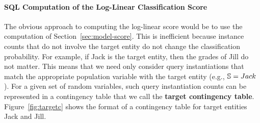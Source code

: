\documentclass{acm_proc_article-sp}
\begin{document}

\paragraph{SQL Computation of the Log-Linear Classification Score}

The obvious approach to computing the log-linear score would be to use the computation of Section~\ref{sec:model-score}.
This is inefficient because instance counts that do not involve the target entity do not change the classification probability. For example, if Jack is the target entity, then the grades of Jill do not matter. This means that we need only consider query instantiations that match the appropriate population variable with the target entity (e.g., $\S = Jack$). For a given set of random variables, such query instantiation counts can be represented in a contingency table that we call the \textbf{target contingency table}. Figure~\ref{fig:targetc} shows the format of a contingency table for target entities Jack and Jill.
\end{document}
